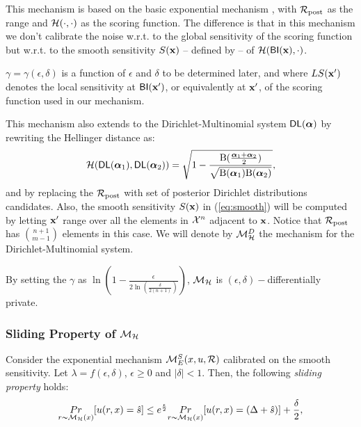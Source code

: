 \documentclass[sigconf]{acmart}
\begin{document}
This mechanism is based on the basic exponential mechanism
\cite{talwar}, with $\mathcal{R}_{\textup{post}}$ as the range and
$\mathcal{H}(\cdot,\cdot)$ as the scoring function. The difference is
that in this mechanism we don't calibrate the noise w.r.t. to the
global sensitivity of the scoring function but w.r.t. to the smooth
sensitivity $S(\textbf{x})$ -- defined by \citet{nissim2007smooth}-- of
$\mathcal{H}(\mathsf{BI}(\textbf{x}), \cdot)$.

$\gamma = \gamma(\epsilon, \delta)$ is a function of $\epsilon$ and $\delta$ to
be determined later, and where $LS(\textbf{x}')$ denotes the local
sensitivity at $\mathsf{BI}(\textbf{x}')$, or equivalently at $\textbf{x}'$,
of the scoring function used in our mechanism.

This mechanism also extends to the Dirichlet-Multinomial system $\mathsf{DL}(\boldsymbol{\alpha})$ by rewriting the Hellinger distance as:
\[
  \mathcal{H}(\mathsf{DL}(\boldsymbol{\alpha}_1), \mathsf{DL}(\boldsymbol{\alpha}_2)) = \sqrt{1 - \frac{\textup{B}(\frac{\boldsymbol{\alpha}_1 + \boldsymbol{\alpha}_2}{2})}{\sqrt{\textup{B}(\boldsymbol{\alpha}_1) \textup{B}(\boldsymbol{\alpha}_2)}}},
\]
and by replacing the $\mathcal{R}_{\textup{post}}$ with set of posterior Dirichlet
distributions candidates. Also, the smooth sensitivity $S(\textbf{x})$
in (\ref{eq:smooth}) will be computed by letting $\textbf{x}'$ range
over all the elements in $\mathcal{X}^{n}$ adjacent to $\textbf{x}$. Notice
that $\mathcal{R}_{\textup{post}}$ has $\binom{n + 1}{m - 1}$ elements in this case. We
will denote by $\mathcal{M}^{D}_{\mathcal{H}}$ the mechanism for the
Dirichlet-Multinomial system.


By setting the $\gamma$ as $\ln(1 - \frac{\epsilon}{2 \ln (\frac{\delta}{2 (n + 1)})})$, $\mathcal{M}_{\mathcal{H}}$ is $(\epsilon, \delta) -$differentially private.


\subsubsection{Sliding Property of $\mathcal{M}_{\mathcal{H}}$}
\begin{lem}
Consider the exponential mechanism  $\mathcal{M}_E^S(x,u,\mathcal{R})$
calibrated on the smooth sensitivity. Let $\lambda = f(\epsilon,
\delta)$, $\epsilon\geq 0$ and $|\delta| < 1$. Then, the following \emph{sliding property} holds:
\begin{equation*}
\underset{r \thicksim \mathcal{M}_{\mathcal{H}}(x)}{Pr}[u(r,x) = \hat{s}]
\leq
e^{\frac{\epsilon}{2}} \underset{r \thicksim \mathcal{M}_{\mathcal{H}}(x)}{Pr}[u(r,x) = (\Delta + \hat{s})] + \frac{\delta}{2},
\end{equation*}

\end{lem}
\end{document}
